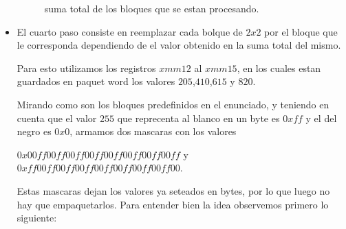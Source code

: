 \begin{itemize}
\begin{figure}[H]

		\caption{suma total de los bloques que se estan procesando.}
		\label{PHADDW}
	\end{figure}

	\item El cuarto paso consiste en reemplazar cada bolque de $2x2$ por el bloque que le corresponda dependiendo de el valor obtenido en la suma total del mismo.

	Para esto utilizamos los registros $xmm12$ al $xmm15$, en los cuales estan guardados en paquet word los valores $205$,$410$,$615$ y $820$.

	Mirando como son los bloques predefinidos en el enunciado, y teniendo en cuenta que el valor $255$ que reprecenta al blanco en un byte es $0xff$ y el del negro es $0x0$, armamos dos mascaras con los valores

	$0x00ff00ff00ff00ff00ff00ff00ff00ff$ y $0xff00ff00ff00ff00ff00ff00ff00ff00$. 

	Estas mascaras dejan los valores ya seteados en bytes, por lo que luego no hay que empaquetarlos.
	Para entender bien la idea observemos primero lo siguiente:


\end{itemize}
